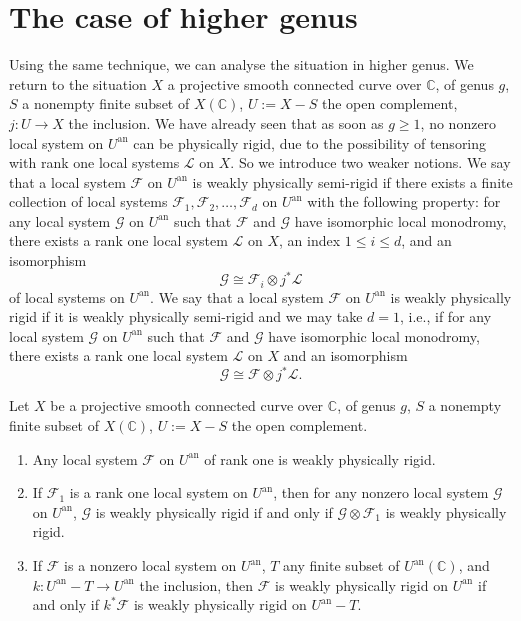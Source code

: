 \section{The case of higher genus}
\label{sec:1.2}

Using the same technique, we can analyse the situation in higher genus. We
return to the situation \(X\) a projective smooth connected curve over
\(\mathbb{C}\), of genus \(g\), \(S\) a nonempty finite subset of
\(X(\mathbb{C})\), \(U:=X-S\) the open complement, \(j:U\to X\) the inclusion.
We have already seen that as soon as \(g\geq 1\), no nonzero local system on
\(U^{\mathrm{an}}\) can be physically rigid, due to the possibility of
tensoring with rank one local systems \(\mathcal{L}\) on \(X\). So we introduce
two weaker notions. We say that a local system \(\mathcal{F}\) on
\(U^{\mathrm{an}}\) is weakly physically semi-rigid if there exists a finite
collection of local systems \(\mathcal{F}_1,\mathcal{F}_2,\ldots,\mathcal{F}_d\)
on \(U^{\mathrm{an}}\) with the following property: for any local system
\(\mathcal{G}\) on \(U^{\mathrm{an}}\) such that \(\mathcal{F}\) and
\(\mathcal{G}\) have isomorphic local monodromy, there exists a rank one local
system \(\mathcal{L}\) on \(X\), an index \(1\leq i\leq d\), and an isomorphism
\[
  \mathcal{G}\cong \mathcal{F}_i\otimes j^*\mathcal{L}
\]
of local systems on \(U^{\mathrm{an}}\). We say that a local system
\(\mathcal{F}\) on \(U^{\mathrm{an}}\) is weakly physically rigid if it is
weakly physically semi-rigid and we may take \(d=1\), i.e., if for any local
system \(\mathcal{G}\) on \(U^{\mathrm{an}}\) such that \(\mathcal{F}\) and
\(\mathcal{G}\) have isomorphic local monodromy, there exists a rank one local
system \(\mathcal{L}\) on \(X\) and an isomorphism
\[
  \mathcal{G}\cong\mathcal{F}\otimes j^*\mathcal{L}.
\]

\setcounter{theorem}{1}
\begin{lemma}
\label{lem:1.2.2}
Let \(X\) be a projective smooth connected curve over \(\mathbb{C}\), of genus
\(g\), \(S\) a nonempty finite subset of \(X(\mathbb{C})\), \(U:=X-S\) the open
complement.
\leavevmode\par
\begin{enumerate}[label=(\arabic*)]
\item Any local system \(\mathcal{F}\) on \(U^{\mathrm{an}}\) of rank one is
weakly physically rigid.
\item If \(\mathcal{F}_1\) is a rank one local system on \(U^{\mathrm{an}}\),
then for any nonzero local system \(\mathcal{G}\) on \(U^{\mathrm{an}}\),
\(\mathcal{G}\) is weakly physically rigid if and only if
\(\mathcal{G}\otimes\mathcal{F}_1\) is weakly physically rigid.
\item If \(\mathcal{F}\) is a nonzero local system on \(U^{\mathrm{an}}\),
\(T\) any finite subset of \(U^{\mathrm{an}}(\mathbb{C})\), and
\(k:U^{\mathrm{an}}-T\to U^{\mathrm{an}}\) the inclusion, then
\(\mathcal{F}\) is weakly physically rigid on \(U^{\mathrm{an}}\) if and only
if \(k^*\mathcal{F}\) is weakly physically rigid on \(U^{\mathrm{an}}-T\).
\end{enumerate}
\end{lemma}

